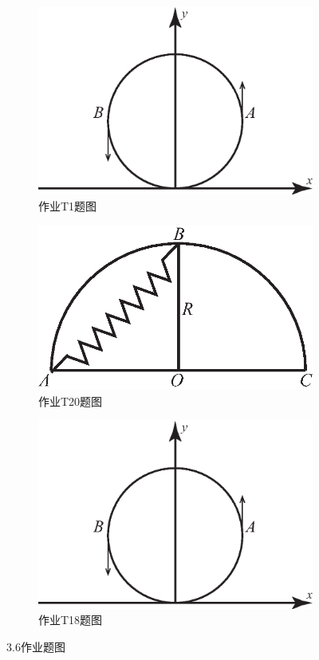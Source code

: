 \begin{figure}[htbp]
	\centering
	\begin{subfigure}[t]{0.4\textwidth}
		\centering
		\includegraphics[width=\textwidth]{C3-fig1.eps}
		\caption{作业T1题图}
		\label{C3-fig1}
	\end{subfigure}
	\begin{subfigure}[t]{0.4\textwidth}
		\centering
		\includegraphics[width=\textwidth]{C3-fig2.eps}
		\caption{作业T20题图}
		\label{C3-fig2}
	\end{subfigure}
	\begin{subfigure}[t]{0.4\textwidth}
		\centering
		\includegraphics[width=\textwidth]{C3-fig1.eps}
		\caption{作业T18题图}
		\label{C3-fig3}
	\end{subfigure}
	\caption{3.6作业题图}
\end{figure}


